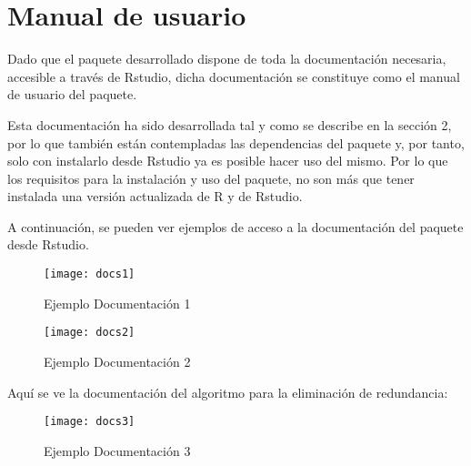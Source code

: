 \section{Manual de usuario}
Dado que el paquete desarrollado dispone de toda la documentaci\'on necesaria, accesible a trav\'es de Rstudio, dicha documentaci\'on se constituye como el manual de usuario del paquete. 

Esta documentaci\'on ha sido desarrollada tal y como se describe en la secci\'on 2, por lo que tambi\'en est\'an contempladas las dependencias del paquete y, por tanto, solo con instalarlo desde Rstudio ya es posible hacer uso del mismo. Por lo que los requisitos para la instalaci\'on y uso del paquete, no son m\'as que tener instalada una versi\'on actualizada de R y de Rstudio.

A continuaci\'on, se pueden ver ejemplos de acceso a la documentaci\'on del paquete desde Rstudio.
\begin{figure}[H]
    \centering
    \texttt{[image: docs1]}
    \caption{Ejemplo Documentaci\'on 1}
    \label{fig:docs1}
\end{figure}

\begin{figure}[H]
    \centering
    \texttt{[image: docs2]}
    \caption{Ejemplo Documentaci\'on 2}
    \label{fig:docs2}
\end{figure}

Aqu\'i se ve la documentaci\'on del algoritmo para la eliminaci\'on de redundancia:
\begin{figure}[H]
    \centering
    \texttt{[image: docs3]}
    \caption{Ejemplo Documentaci\'on 3}
    \label{fig:docs3}
\end{figure}
\newpage
